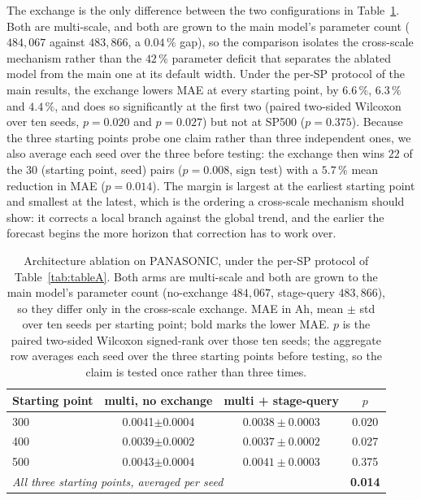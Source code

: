 \documentclass[final,5p,times,twocolumn]{elsarticle}
\begin{document}
The exchange is the only difference between the two configurations in
Table~\ref{tab:ablation}. Both are multi-scale, and both are grown to the
main model's parameter count ($484{,}067$ against $483{,}866$, a
$0.04\,\%$ gap), so the comparison isolates the cross-scale mechanism
rather than the $42\,\%$ parameter deficit that separates the ablated
model from the main one at its default width. Under the per-SP protocol
of the main results, the exchange lowers MAE at every starting point, by
$6.6\,\%$, $6.3\,\%$ and $4.4\,\%$, and does so significantly at the
first two (paired two-sided Wilcoxon over ten seeds, $p=0.020$ and
$p=0.027$) but not at SP500 ($p=0.375$). Because the three starting
points probe one claim rather than three independent ones, we also
average each seed over the three before testing: the exchange then wins
$22$ of the $30$ (starting point, seed) pairs ($p=0.008$, sign test)
with a $5.7\,\%$ mean reduction in MAE ($p=0.014$). The margin is
largest at the earliest starting point and smallest at the latest, which
is the ordering a cross-scale mechanism should show: it corrects a local
branch against the global trend, and the earlier the forecast begins the
more horizon that correction has to work over.
\begin{table}[htbp]
\centering
\caption{Architecture ablation on PANASONIC, under the per-SP protocol
of Table~\ref{tab:tableA}. Both arms are multi-scale and both are grown
to the main model's parameter count (no-exchange $484{,}067$,
stage-query $483{,}866$), so they differ only in the cross-scale
exchange. MAE in Ah, mean $\pm$ std over ten seeds per
starting point; bold marks the lower MAE. $p$ is the paired two-sided
Wilcoxon signed-rank over those ten seeds; the aggregate row averages
each seed over the three starting points before testing, so the claim is
tested once rather than three times.}
\label{tab:ablation}
\footnotesize
\setlength{\tabcolsep}{6pt}
\begin{tabular}{lccc}
\toprule
Starting point & multi, no exchange & multi + stage-query & $p$ \\
\midrule
300 & 0.0041$\pm$0.0004 & $\mathbf{0.0038\pm0.0003}$ & 0.020 \\
400 & 0.0039$\pm$0.0002 & $\mathbf{0.0037\pm0.0002}$ & 0.027 \\
500 & 0.0043$\pm$0.0004 & $\mathbf{0.0041\pm0.0003}$ & 0.375 \\
\midrule
\multicolumn{3}{l}{\emph{All three starting points, averaged per seed}} & \textbf{0.014} \\
\bottomrule
\end{tabular}
\end{table}
\end{document}
